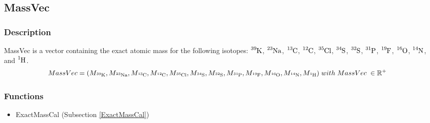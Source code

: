 \subsection{MassVec}\label{MassVec}
\subsubsection{Description}
MassVec is a vector containing the exact atomic mass for the following isotopes: $\ce{^{39}K}$, $\ce{^{23}Na}$, $\ce{^{13}C}$, $\ce{^{12}C}$, $\ce{^{35}Cl}$, $\ce{^{34}S}$, $\ce{^{32}S}$, $\ce{^{31}P}$, $\ce{^{19}F}$, $\ce{^{16}O}$, $\ce{^{14}N}$, and $\ce{^{1}H}$.
\begin{equation}
MassVec=(M_{\ce{^{39}K}}, M_{\ce{^{23}Na}}, M_{\ce{^{13}C}}, M_{\ce{^{12}C}}, M_{\ce{^{35}Cl}}, M_{\ce{^{34}S}}, M_{\ce{^{32}S}}, M_{\ce{^{31}P}}, M_{\ce{^{19}F}}, M_{\ce{^{16}O}}, M_{\ce{^{14}N}}, M_{\ce{^{1}H}}) \\
\; with \; MassVec \;\in \mathbb{R}^{+}
\end{equation}
\subsubsection{Functions}
\begin{itemize}
\item ExactMassCal (Subsection \ref{ExactMassCal})
\end{itemize}

